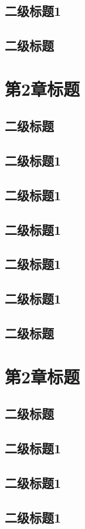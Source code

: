 \documentclass[master,academic]{ysuthesis} %
\begin{document}
	\section{二级标题1}
	\section{二级标题}
	\chapter{第2章标题}
	\section{二级标题}
	\section{二级标题1}
	\section{二级标题1}
	\section{二级标题1}
	\section{二级标题1}
	\section{二级标题1}
	\section{二级标题}
	\chapter{第2章标题}
	\section{二级标题}
	\section{二级标题1}
	\section{二级标题1}
	\section{二级标题1}
\end{document}
